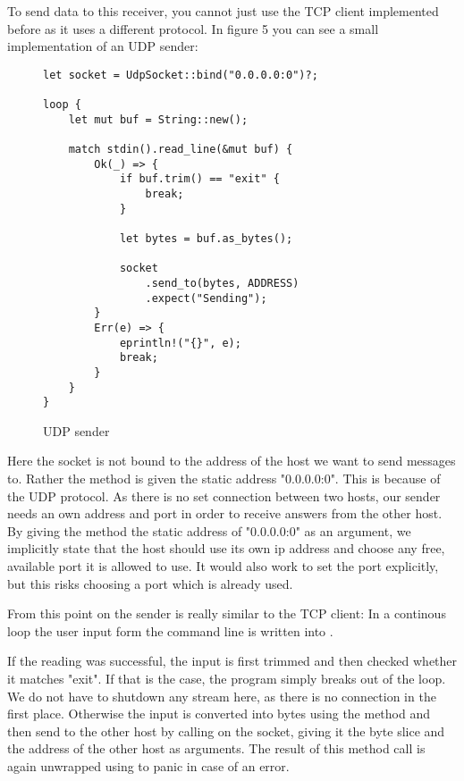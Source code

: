 To send data to this receiver, you cannot just use the TCP client implemented before as it uses a different protocol. In
figure 5 you can see a small implementation of an UDP sender:

\begin{figure}[h]
    \begin{verbatim}
let socket = UdpSocket::bind("0.0.0.0:0")?;

loop {
    let mut buf = String::new();

    match stdin().read_line(&mut buf) {
        Ok(_) => {
            if buf.trim() == "exit" {
                break;
            }

            let bytes = buf.as_bytes();

            socket
                .send_to(bytes, ADDRESS)
                .expect("Sending");
        }
        Err(e) => {
            eprintln!("{}", e);
            break;
        }
    }
}
    \end{verbatim}
    \caption{UDP sender}
\end{figure}

Here the socket is not bound to the address of the host we want to send messages to. Rather the  method is
given the static address "0.0.0.0:0". This is because of the UDP protocol. As there is no set connection between two
hosts, our sender needs an own address and port in order to receive answers from the other host. By giving the
 method the static address of "0.0.0.0:0" as an argument, we implicitly state that the host should use its
own ip address and choose any free, available port it is allowed to use. It would also work to set the port explicitly,
but this risks choosing a port which is already used.

From this point on the sender is really similar to the TCP client: In a continous loop the user input form the command
line is written into .

If the reading was successful, the input is first trimmed and then checked whether it
matches "exit". If that is the case, the program simply breaks out of the loop. We do not have to shutdown any stream
here, as there is no connection in the first place. Otherwise the input is converted into bytes using the method
 and then send to the other host by calling  on the socket, giving it the byte slice and
the address of the other host as arguments. The result of this method call is again unwrapped using  to
panic in case of an error.

